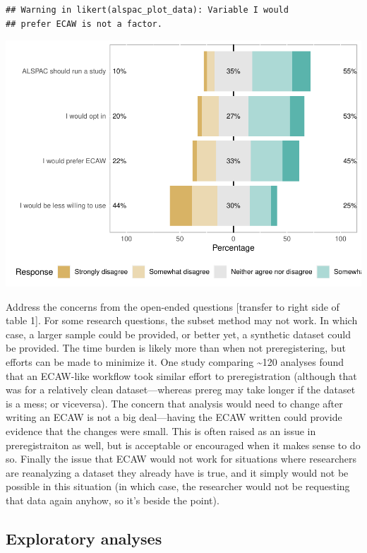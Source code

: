 \documentclass[
  man]{apa6}
\begin{document}
\begin{verbatim}
## Warning in likert(alspac_plot_data): Variable I would
## prefer ECAW is not a factor.
\end{verbatim}

\includegraphics{manuscript_files/figure-latex/unnamed-chunk-13-1.pdf}

Address the concerns from the open-ended questions {[}transfer to right side of table 1{]}. For some research questions, the subset method may not work. In which case, a larger sample could be provided, or better yet, a synthetic dataset could be provided. The time burden is likely more than when not preregistering, but efforts can be made to minimize it. One study comparing \textasciitilde120 analyses found that an ECAW-like workflow took similar effort to preregistration (although that was for a relatively clean dataset---whereas prereg may take longer if the dataset is a mess; or viceversa). The concern that analysis would need to change after writing an ECAW is not a big deal---having the ECAW written could provide evidence that the changes were small. This is often raised as an issue in preregistraiton as well, but is acceptable or encouraged when it makes sense to do so. Finally the issue that ECAW would not work for situations where researchers are reanalyzing a dataset they already have is true, and it simply would not be possible in this situation (in which case, the researcher would not be requesting that data again anyhow, so it's beside the point).

\hypertarget{exploratory-analyses}{%
\subsection{Exploratory analyses}\label{exploratory-analyses}}
\end{document}
